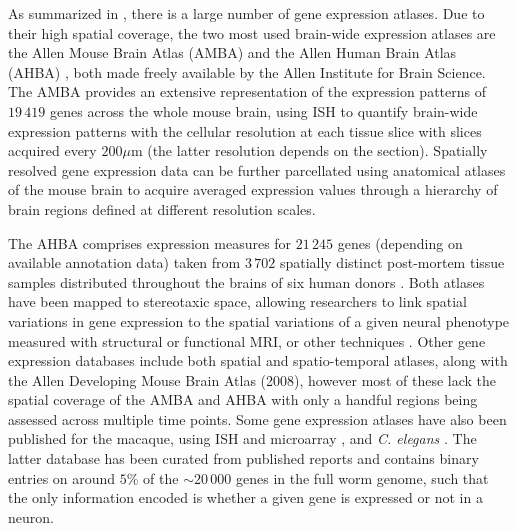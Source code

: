 As summarized in \citet{Keil2018}, there is a large number of gene expression atlases.
Due to their high spatial coverage, the two most used brain-wide expression atlases are the Allen Mouse Brain Atlas (AMBA) \citep{Lein2007a} and the Allen Human Brain Atlas (AHBA) \citep{Hawrylycz2012}, both made freely available by the Allen Institute for Brain Science.
The AMBA provides an extensive representation of the expression patterns of $19\,419$ genes across the whole mouse brain, using ISH to quantify brain-wide expression patterns with the cellular resolution at each tissue slice with slices acquired every $200\mu$m (the latter resolution depends on the section).
Spatially resolved gene expression data can be further parcellated using anatomical atlases of the mouse brain \citep{Johnson2010,Furth2018} to acquire averaged expression values through a hierarchy of brain regions defined at different resolution scales.

The AHBA comprises expression measures for $21\,245$ genes (depending on available annotation data) taken from $3\,702$ spatially distinct post-mortem tissue samples distributed throughout the brains of six human donors \citep{Hawrylycz2012,Hawrylycz2015}.
Both atlases have been mapped to stereotaxic space, allowing researchers to link spatial variations in gene expression to the spatial variations of a given neural phenotype measured with structural or functional MRI, or other techniques \citep{Furth2018}.
Other gene expression databases include both spatial \citep{Fertuzinhos2014} and spatio-temporal \citep{Ayoub2011,Belgard2011,Colantuoni2011,Miller2014} atlases, along with the Allen Developing Mouse Brain Atlas (2008), however most of these lack the spatial coverage of the AMBA and AHBA with only a handful regions being assessed across multiple time points. Some gene expression atlases have also been published for the macaque, using ISH and microarray \citep{Bakken2016}, and \textit{C. elegans} \citep{Harris2010}.
The latter database has been curated from published reports and contains binary entries on around $5$\% of the $\sim20\,000$ genes in the full worm genome, such that the only information encoded is whether a given gene is expressed or not in a neuron.

